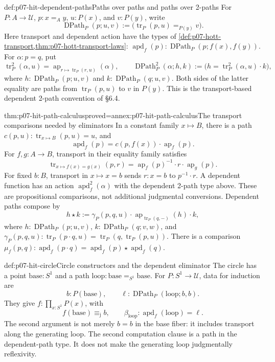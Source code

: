 \begin{hbdefinition}{def:p07-hit-dependent-paths}{Paths over paths and paths over 2-paths}
For \(P:A\to\mathcal U\), \(p:x=_A y\), \(u:P(x)\), and
\(v:P(y)\), write
\[
 \operatorname{DPath}_P(p;u,v)
       :=\bigl(\operatorname{tr}_P(p,u)=_{P(y)}v\bigr).
\]
Here transport and dependent action have the types of
\cref{def:p07-hott-transport,thm:p07-hott-transport-laws}:
\(\operatorname{apd}_f(p):\operatorname{DPath}_P(p;f(x),f(y))\).
For \(\alpha:p=q\), put
\[
 \operatorname{tr}^2_P(\alpha,u)
 =\operatorname{ap}_{r\mapsto\operatorname{tr}_P(r,u)}(\alpha),\qquad
 \operatorname{DPath}^2_P(\alpha;h,k)
 :=\bigl(h=\operatorname{tr}^2_P(\alpha,u)\cdot k\bigr),
\]
where \(h:\operatorname{DPath}_P(p;u,v)\) and
\(k:\operatorname{DPath}_P(q;u,v)\). Both sides of the latter equality
are paths from \(\operatorname{tr}_P(p,u)\) to \(v\) in \(P(y)\).
This is the transport-based dependent 2-path convention of \S6.4.
\end{hbdefinition}

\begin{hblemma}{thm:p07-hit-path-calculus}{proved=annex:p07-hit-path-calculus}{The transport comparisons needed by eliminators}
In a constant family \(x\mapsto B\), there is a path
\(c(p,u):\operatorname{tr}_{x\mapsto B}(p,u)=u\), and
\[
 \operatorname{apd}_f(p)=c(p,f(x))\cdot\operatorname{ap}_f(p).
\]
For \(f,g:A\to B\), transport in their equality family satisfies
\[
 \operatorname{tr}_{x\mapsto f(x)=g(x)}(p,r)
       =\operatorname{ap}_f(p)^{-1}\cdot r\cdot\operatorname{ap}_g(p).
\]
For fixed \(b:B\), transport in \(x\mapsto x=b\) sends
\(r:x=b\) to \(p^{-1}\cdot r\). A dependent function has an action
\(\operatorname{apd}^2_f(\alpha)\) with the dependent 2-path type above.
These are propositional comparisons, not additional judgmental conversions.
Dependent paths compose by
\[
 h\star k:=\gamma_P(p,q,u)\cdot
       \operatorname{ap}_{\operatorname{tr}_P(q,-)}(h)\cdot k,
\]
where \(h:\operatorname{DPath}_P(p;u,v)\),
\(k:\operatorname{DPath}_P(q;v,w)\), and
\(\gamma_P(p,q,u):\operatorname{tr}_P(p\cdot q,u)=
\operatorname{tr}_P(q,\operatorname{tr}_P(p,u))\).
There is a comparison
\(\mu_f(p,q):\operatorname{apd}_f(p\cdot q)=
\operatorname{apd}_f(p)\star\operatorname{apd}_f(q)\).
\end{hblemma}

\begin{hbdefinition}{def:p07-hit-circle}{Circle constructors and the dependent eliminator}
The circle has a point \(\mathrm{base}:S^1\) and a path
\(\mathrm{loop}:\mathrm{base}=_{S^1}\mathrm{base}\).
For \(P:S^1\to\mathcal U\), data for induction are
\[
 b:P(\mathrm{base}),\qquad
 \ell:\operatorname{DPath}_P(\mathrm{loop};b,b).
\]
They give \(f:\prod_{x:S^1}P(x)\), with
\[
 f(\mathrm{base})\equiv_{\mathrm j}b,\qquad
 \beta_{\mathrm{loop}}:
             \operatorname{apd}_f(\mathrm{loop})=\ell.
\]
The second argument is not merely \(b=b\) in the base fiber: it includes
transport along the generating loop. The second computation clause is a path
in the dependent-path type. It does not make the generating loop judgmentally
reflexivity.
\end{hbdefinition}

